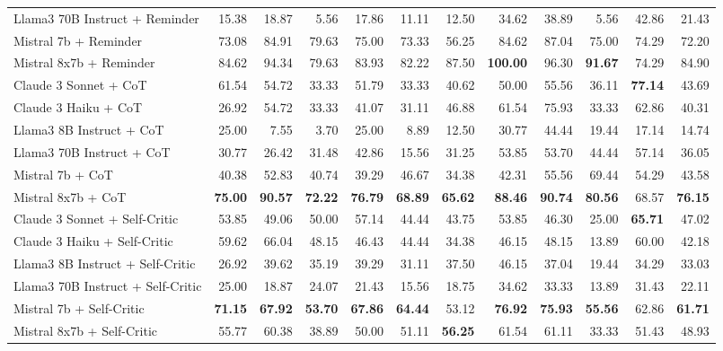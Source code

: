 \begin{table}[H]
{\begin{tabular}{lrrrrrrrrrrr}
Llama3 70B Instruct + Reminder & 15.38 & 18.87 & 5.56 & 17.86 & 11.11 & 12.50 & 34.62 & 38.89 & 5.56 & 42.86 & 21.43 \\
Mistral 7b + Reminder & 73.08 & 84.91 & 79.63 & 75.00 & 73.33 & 56.25 & 84.62 & 87.04 & 75.00 & 74.29 & 72.20 \\
Mistral 8x7b + Reminder & 84.62 & 94.34 & 79.63 & 83.93 & 82.22 & 87.50 & \textbf{100.00} & 96.30 & \textbf{91.67} & 74.29 & 84.90 \\
\rowcolor{Gray}
Claude 3 Sonnet + CoT & 61.54 & 54.72 & 33.33 & 51.79 & 33.33 & 40.62 & 50.00 & 55.56 & 36.11 & \textbf{77.14} & 43.69 \\
\rowcolor{Gray}
Claude 3 Haiku + CoT & 26.92 & 54.72 & 33.33 & 41.07 & 31.11 & 46.88 & 61.54 & 75.93 & 33.33 & 62.86 & 40.31 \\
\rowcolor{Gray}
Llama3 8B Instruct + CoT & 25.00 & 7.55 & 3.70 & 25.00 & 8.89 & 12.50 & 30.77 & 44.44 & 19.44 & 17.14 & 14.74 \\
\rowcolor{Gray}
Llama3 70B Instruct + CoT & 30.77 & 26.42 & 31.48 & 42.86 & 15.56 & 31.25 & 53.85 & 53.70 & 44.44 & 57.14 & 36.05 \\
\rowcolor{Gray}
Mistral 7b + CoT & 40.38 & 52.83 & 40.74 & 39.29 & 46.67 & 34.38 & 42.31 & 55.56 & 69.44 & 54.29 & 43.58 \\
\rowcolor{Gray}
Mistral 8x7b + CoT & \textbf{75.00} & \textbf{90.57} & \textbf{72.22} & \textbf{76.79} & \textbf{68.89} & \textbf{65.62} & \textbf{88.46} & \textbf{90.74} & \textbf{80.56} & 68.57 & \textbf{76.15} \\
Claude 3 Sonnet + Self-Critic & 53.85 & 49.06 & 50.00 & 57.14 & 44.44 & 43.75 & 53.85 & 46.30 & 25.00 & \textbf{65.71} & 47.02 \\
Claude 3 Haiku + Self-Critic & 59.62 & 66.04 & 48.15 & 46.43 & 44.44 & 34.38 & 46.15 & 48.15 & 13.89 & 60.00 & 42.18 \\
Llama3 8B Instruct + Self-Critic & 26.92 & 39.62 & 35.19 & 39.29 & 31.11 & 37.50 & 46.15 & 37.04 & 19.44 & 34.29 & 33.03 \\
Llama3 70B Instruct + Self-Critic & 25.00 & 18.87 & 24.07 & 21.43 & 15.56 & 18.75 & 34.62 & 33.33 & 13.89 & 31.43 & 22.11 \\
Mistral 7b + Self-Critic & \textbf{71.15} & \textbf{67.92} & \textbf{53.70} & \textbf{67.86} & \textbf{64.44} & 53.12 & \textbf{76.92} & \textbf{75.93} & \textbf{55.56} & 62.86 & \textbf{61.71} \\
Mistral 8x7b + Self-Critic & 55.77 & 60.38 & 38.89 & 50.00 & 51.11 & \textbf{56.25} & 61.54 & 61.11 & 33.33 & 51.43 & 48.93 \\

\end{tabular}}
\end{table}
